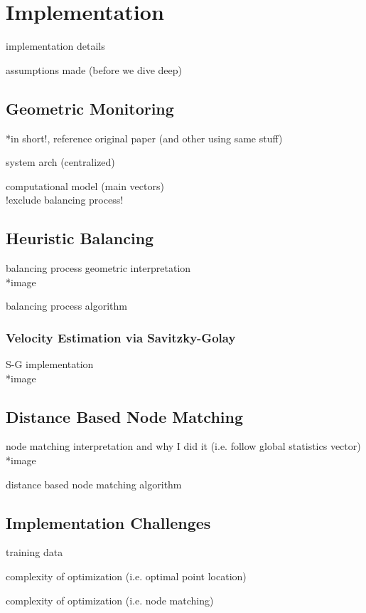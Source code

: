 \chapter{Implementation} \label{chap:impl}

implementation details

assumptions made (before we dive deep)

\section{Geometric Monitoring} \label{sec:impl-GM}

*in short!, reference original paper (and other using same stuff)

system arch (centralized)

computational model (main vectors)\\
	!exclude balancing process!

\section{Heuristic Balancing} \label{sec:impl-heuristic}

balancing process geometric interpretation\\
*image

balancing process algorithm

\subsection{Velocity Estimation via Savitzky-Golay} \label{subsec:impl-heuristic-vel}

S-G implementation\\
*image

\section{Distance Based Node Matching} \label{sec:impl-distNodeMatch}

node matching interpretation and why I did it (i.e. follow global statistics vector)\\
*image

distance based node matching algorithm

\section{Implementation Challenges} \label{sec:impl-implChallenges}

training data

complexity of optimization (i.e. optimal point location)

complexity of optimization (i.e. node matching)